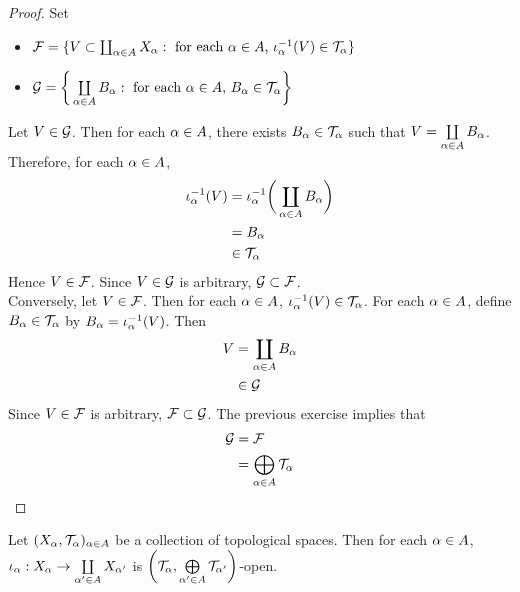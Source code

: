 \documentclass{book}
\begin{document}
	\begin{proof}
		Set  
		\begin{itemize}
			\item $\mathcal{F}= \{V \subset \coprod_{\alpha \in A}  X_{\alpha}: \text{ for each $\alpha \in A$, $\iota_{\alpha}^{-1}(V) \in \mathcal{T}_{\alpha}$}\}$ 
			\item $\mathcal{G} = \bigg \{  \coprod\limits_{\alpha \in A}  B_{\alpha}: \text{ for each $\alpha \in A$, } B_{\alpha} \in \mathcal{T}_{\alpha} \bigg\}$
		\end{itemize}
		Let $V \in \mathcal{G}$. Then for each $\alpha \in A$, there exists $B_{\alpha} \in \mathcal{T}_{\alpha}$ such that $V =  \coprod\limits_{\alpha \in A}  B_{\alpha}$. Therefore, for each $\alpha \in A$, 
		\begin{align*}
			\iota_{\alpha}^{-1}(V)
			& = \iota_{\alpha}^{-1} \bigg( \coprod\limits_{\alpha \in A}  B_{\alpha} \bigg) \\
			& = B_{\alpha} \\
			& \in \mathcal{T}_{\alpha}
		\end{align*}
		Hence $V \in \mathcal{F}$. Since $V \in \mathcal{G}$ is arbitrary, $\mathcal{G} \subset \mathcal{F}$. \\
		Conversely, let $V \in \mathcal{F}$. Then for each $\alpha \in A$, $\iota_{\alpha}^{-1}(V) \in \mathcal{T}_{\alpha}$. For each $\alpha \in A$, define $B_{\alpha} \in \mathcal{T}_{\alpha}$ by $B_{\alpha} = \iota_{\alpha}^{-1}(V)$. Then 
		\begin{align*}
			V 
			& = \coprod\limits_{\alpha \in A} B_{\alpha} \\
			& \in \mathcal{G} 
		\end{align*}
		Since $V \in \mathcal{F}$ is arbitrary, $\mathcal{F} \subset \mathcal{G}$. The previous exercise implies that 
		\begin{align*}
			\mathcal{G}
			& = \mathcal{F} \\
			& = \bigoplus\limits_{\alpha \in A} \mathcal{T}_{\alpha}
		\end{align*}
	\end{proof}

	\begin{ex} 
		Let $(X_{\alpha}, \mathcal{T}_{\alpha})_{\alpha \in A}$ be a collection of topological spaces. Then for each $\alpha \in A$, $\iota_{\alpha}: X_{\alpha} \rightarrow \coprod\limits_{\alpha' \in A} X_{\alpha'}$ is $\bigg(\mathcal{T}_{\alpha}, \bigoplus\limits_{\alpha' \in A} \mathcal{T}_{\alpha'} \bigg)$-open.
	\end{ex}
\end{document}
